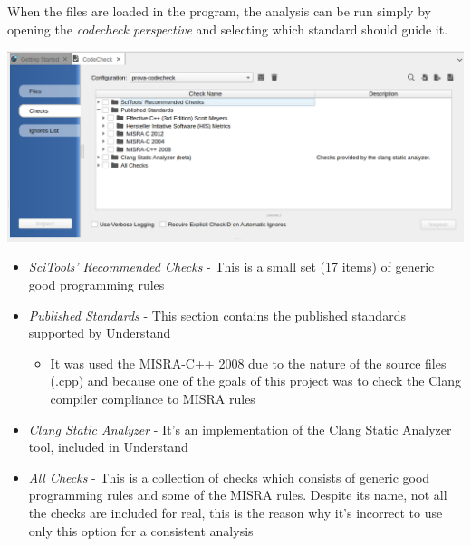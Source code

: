 When the files are loaded in the program, the analysis can be run simply by opening the \textsl{codecheck perspective} and selecting which standard should guide it.\newline\newline
\vspace{1cm}
\begin{minipage}{\linewidth}
	\includegraphics[width=\textwidth]{img/Codecheck.png}
\end{minipage}

\begin{itemize}
	\item \textsl{SciTools' Recommended Checks} - This is a small set (17 items) of generic good programming rules
	\item \textsl{Published Standards} - This section contains the published standards supported by Understand
		\begin{itemize}
			\item It was used the MISRA-C++ 2008 due to the nature of the source files (.cpp) and because one of the goals of this project was to check the Clang compiler compliance to MISRA rules
		\end{itemize}
	\item \textsl{Clang Static Analyzer} - It's an implementation of the Clang Static Analyzer tool, included in Understand
	\item \textsl{All Checks} - This is a collection of checks which consists of generic good programming rules and some of the MISRA rules. Despite its name, not all the checks are included for real, this is the reason why it's incorrect to use only this option for a consistent analysis
\end{itemize}

